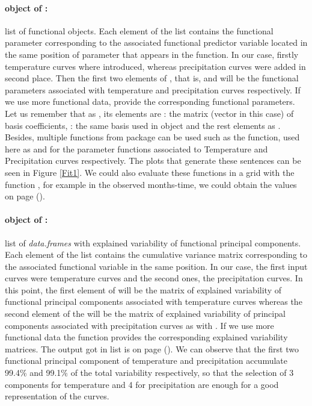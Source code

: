 \paragraph{ object of :} list of functional objects. Each element of the list contains the functional parameter corresponding to the associated functional predictor variable located in the same position of  parameter that appears in the function. In our case, firstly temperature curves where introduced, whereas precipitation curves were added in second place. Then the first two elements of , that is, \code{[[1]]} and \code{[[2]]} will be the functional parameters associated with temperature and precipitation curves respectively. If we use more functional data,  provide the corresponding functional parameters. Let us remember that as , its elements are : the matrix (vector in this case) of basis coefficients, : the same basis used in  object and the rest elements as . Besides, multiple functions from  package can be used such as the  function, used here as  and  for the parameter  functions associated to Temperature and Precipitation curves respectively. The plots that generate these sentences can be seen in Figure \ref{Fit1}. We could also evaluate these functions in a grid with the function , for example in the observed months-time, we could obtain the values on page (\pageref{BasisEval}).

\paragraph{ object of :} list of {\it data.frames} with explained variability of functional principal components. Each element of the list contains the cumulative variance matrix corresponding to the associated functional variable in the same position. In our case, the first input curves were temperature curves and the second ones, the precipitation curves. In this point, the first element \code{[[1]]} of  will be the matrix of explained variability of functional principal components associated with temperature curves whereas the second element \code{[[2]]} of the  will be the matrix of explained variability of principal components associated with precipitation curves as with . If we use more functional data  the function provides the corresponding explained variability matrices. \noindent The output got in  list is on page (\pageref{VarAcum}). We can observe that the first two functional principal component of temperature and precipitation accumulate 99.4\% and 99.1\% of the total variability respectively, so that the selection of 3 components for temperature and 4 for precipitation are enough for a good representation of the curves.

